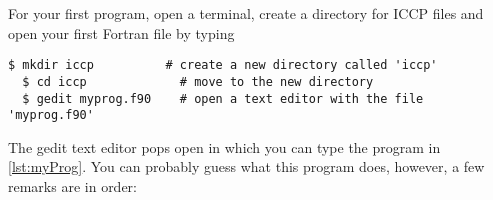 For your first program, open a terminal, create a directory for ICCP files and open your first Fortran file by typing
\begin{lstlisting}[style=prompt, nolol, linewidth=30cm]
  $ mkdir iccp          # create a new directory called 'iccp'
  $ cd iccp             # move to the new directory
  $ gedit myprog.f90    # open a text editor with the file 'myprog.f90'
\end{lstlisting}
The gedit text editor pops open in which you can type the program in \autoref{lst:myProg}.
You can probably guess what this program does, however, a few remarks are in order:
